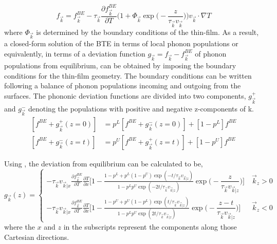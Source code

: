 \begin{equation}\label{eq:ch3-5}
  f_\vec{k}=  f_\vec{k}^{BE}-\tau_\vec{k}\frac{\partial f_\vec{k}^{BE}}{\partial T}\Bigg(1+\Phi_\vec{k}\exp\Big(-\dfrac{z}{\tau_\vec{k} v_\vec{k}}\Big)\Bigg)v_\vec{k}\cdot \nabla T 
\end{equation}
where $\Phi_\vec{k}$ is determined by the boundary conditions of the thin-film. As a result, a closed-form solution of the BTE in terms of local phonon populations or equivalently, in terms of a deviation function $g_\vec{k} = f_\vec{k} - f_\vec{k}^{BE}$ of phonon populations from equilibrium, can be obtained by imposing the boundary conditions for the thin-film geometry. The boundary conditions can be written following a balance of phonon populations incoming and outgoing from the surfaces. The phononic deviation functions are divided into two components, $g_\vec{k}^+$ and $g_\vec{k}^-$ denoting the populations with positive and negative z-components of \gls{k}.
\begin{align}\label{eq:boundary_conditions_ch3_1}
	[f^{BE}+g_\vec{k}^+(z=0)] &= p^L [f^{BE}+g_\vec{k}^-(z=0)]+[1-p^L]f^{BE} \\
	[f^{BE}+g_\vec{k}^-(z=t)] &= p^U [f^{BE}+g_\vec{k}^+(z=t)]+[1-p^U]f^{BE}
\label{eq:boundary_conditions_ch3_2}
\end{align}

Using , the deviation from equilibrium can be calculated to be,
\begin{equation}\label{eq:ch3_g}
g_\vec{k}(z)=
\begin{cases} 
-\tau_\vec{k}v_{\vec{k}|x}\frac{\partial f_\vec{k}^{BE}}{\partial T}\frac{\partial T}{\partial x}\Big[1-\frac{1-p^L+p^L(1-p^U)\exp(-t/\tau_\vec{k}v_{\vec{k}|z})}{1-p^Lp^U\exp(-2t/\tau_\vec{k}v_{\vec{k}|z})}\exp\Big(-\dfrac{z}{\tau_\vec{k}v_{\vec{k}|z}}\Big) \Big] & \: \vec{k}_z >0 \\
-\tau_\vec{k}v_{\vec{k}|x}\frac{\partial f_\vec{k}^{BE}}{\partial T}\frac{\partial T}{\partial x}\Big[1-\frac{1-p^U+p^U(1-p^L)\exp(t/\tau_\vec{k}v_{\vec{k}|z})}{1-p^Lp^U\exp(2t/\tau_\vec{k}v_{\vec{k}|z})}\exp\Big(-\dfrac{z-t}{\tau_\vec{k}v_{\vec{k}|z}}\Big) \Big] & \: \vec{k}_z <0
\end{cases}
\end{equation}
where the $x$ and $z$ in the subscripts represent the components along those Cartesian directions. 
